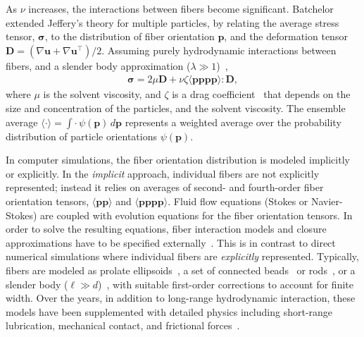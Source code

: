 \documentclass[preprint, 10pt]{elsarticle}
\begin{document}
As $\nu$ increases, the interactions between fibers become significant.
Batchelor extended Jeffery's theory for multiple particles, by relating
the average stress tensor, ${\bm \sigma}$, to the distribution of fiber
orientation $\mathbf{p}$, and the deformation tensor $\mathbf{D} =
(\nabla \mathbf{u} + \nabla \mathbf{u}^\intercal)/2$. Assuming purely
hydrodynamic interactions between fibers, and a slender body
approximation ($\lambda \gg 1$)~\cite{Batchelor1970, Batchelor1970a,
Doi1978, Dinh1984, Shaqfeh1990},
\begin{align}
  {\bm \sigma} = 2 \mu \mathbf{D} + \nu \zeta 
    \langle \mathbf{p p p p} \rangle : \mathbf{D},
\label{eqn:batchelor}
\end{align}
where $\mu$ is the solvent viscosity, and $\zeta$ is a drag
coefficient~\cite{Batchelor1971} that depends on the size and
concentration of the particles, and the solvent viscosity. The ensemble
average $\langle \cdot \rangle = \int \cdot \,
\psi(\mathbf{p})\,d\mathbf{p}$ represents a weighted average over the
probability distribution of particle orientations $\psi(\mathbf{p})$. 

In computer simulations, the fiber orientation distribution is modeled
implicitly or explicitly. In the \emph{implicit} approach, individual
fibers are not explicitly represented; instead it relies on averages of
second- and fourth-order fiber orientation tensors, $\langle \mathbf{p
p} \rangle$ and $\langle \mathbf{p p p p} \rangle$. Fluid flow equations
(Stokes or Navier-Stokes) are coupled with evolution equations for the
fiber orientation tensors. In order to solve the resulting equations,
fiber interaction models and closure approximations have to be specified
externally~\cite{Advani1987, Advani1990, Ferec2014, Perez2017}. This is
in contrast to direct numerical simulations where individual fibers are
\emph{explicitly} represented. Typically, fibers are modeled as
prolate ellipsoids~\cite{Ausias2006}, a set of connected
beads~\cite{Yamamoto1996, Joung2001} or rods~\cite{Schmid2000,
Lindstroem2007}, or a slender body ($\ell \gg d$)~\cite{Fan1998,
Rahnama1995, tor-she2004, tor-gus2006, gus-tor2009}, with suitable
first-order corrections to account for finite width. Over the years, in
addition to long-range hydrodynamic interaction, these models have been
supplemented with detailed physics including short-range lubrication,
mechanical contact, and frictional forces~\cite{Sundararajakumar1997,
Lindstroem2008}.
\end{document}
